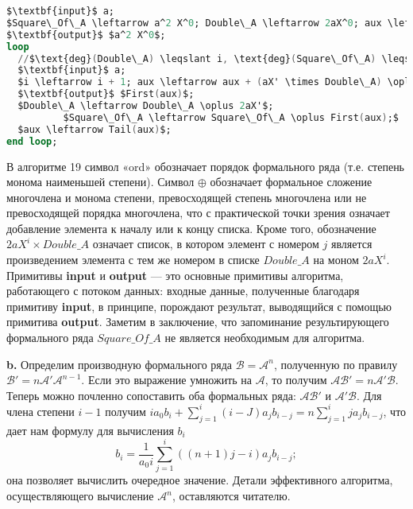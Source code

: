 \begin{lstlisting}[mathescape=true, caption=Квадрат формального ряда, language=Ada]
$\textbf{input}$ a;
$Square\_Of\_A \leftarrow a^2 X^0; Double\_A \leftarrow 2aX^0; aux \leftarrow 0; i \leftarrow 0;$
$\textbf{output}$ $a^2 X^0$;
loop
  //$\text{deg}(Double\_A) \leqslant i, \text{deg}(Square\_Of\_A) \leqslant i, \text{deg}(aux) \leqslant 2i, \text{ord}(aux) \geqslant i$
  $\textbf{input}$ a;
  $i \leftarrow i + 1; aux \leftarrow aux + (aX' \times Double\_A) \oplus a^2 X^{2i}$;
  $\textbf{output}$ $First(aux)$;
  $Double\_A \leftarrow Double\_A \oplus 2aX'$;
          $Square\_Of\_A \leftarrow Square\_Of\_A \oplus First(aux);$
  $aux \leftarrow Tail(aux)$;
end loop;
\end{lstlisting}

В алгоритме 19 символ «ord» обозначает порядок формального ряда
(т.е. степень монома наименьшей степени). Символ $\oplus$ обозначает формальное
сложение многочлена и монома степени, превосходящей степень многочлена
или не превосходящей порядка многочлена, что с практической точки зрения
означает добавление элемента к началу или к концу списка. Кроме того,
обозначение $2aX^i \times Double\_A$ означает список, в котором элемент с номером $j$
является произведением элемента с тем же номером в списке $Double\_A$ на моном $2aX^i$.
Примитивы \textbf{input} и \textbf{output} — это основные примитивы алгоритма, работающего с потоком
данных: входные данные, полученные благодаря примитиву \textbf{input}, в принципе, порождают
результат, выводящийся с помощью примитива \textbf{output}. Заметим в заключение, что запоминание
результирующего формального ряда $Square\_Of\_A$ не является необходимым для алгоритма.

\textbf{b.} Определим производную формального ряда $\mathcal{B} = \mathcal{A}^n$, полученную по правилу $\mathcal{B}' = n\mathcal{A}'\mathcal{A}^{n-1}$.
Если это выражение умножить на $\mathcal{A}$, то получим $\mathcal{AB}' = n\mathcal{A}'\mathcal{B}$. Теперь можно почленно сопоставить
оба формальных ряда: $\mathcal{AB}'$ и $\mathcal{A}'\mathcal{B}$. Для члена степени $i - 1$ получим
$ia_0 b_i + \sum^i_{j=1} (i-J)a_j b_{i-j} = n\sum^i_{j=1} ja_j b_{i-j}$, что дает нам формулу для вычисления $b_i$
\begin{equation*}
b_i = \frac{1}{a_0 i} \sum\limits^i_{j=1}((n + 1)j - i)a_j b_{i-j};
\end{equation*}
она позволяет вычислить очередное значение. Детали эффективного алгоритма,
осуществляющего вычисление $\mathcal{A}^n$, оставляются читателю.